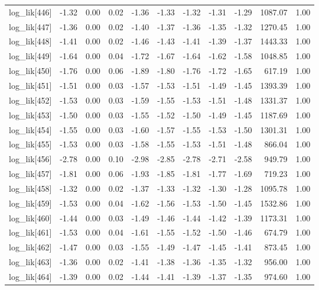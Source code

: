 \begin{table}[ht]
\begin{tabular}{rrrrrrrrrrr}
  log\_lik[446] & -1.32 & 0.00 & 0.02 & -1.36 & -1.33 & -1.32 & -1.31 & -1.29 & 1087.07 & 1.00 \\ 
  log\_lik[447] & -1.36 & 0.00 & 0.02 & -1.40 & -1.37 & -1.36 & -1.35 & -1.32 & 1270.45 & 1.00 \\ 
  log\_lik[448] & -1.41 & 0.00 & 0.02 & -1.46 & -1.43 & -1.41 & -1.39 & -1.37 & 1443.33 & 1.00 \\ 
  log\_lik[449] & -1.64 & 0.00 & 0.04 & -1.72 & -1.67 & -1.64 & -1.62 & -1.58 & 1048.85 & 1.00 \\ 
  log\_lik[450] & -1.76 & 0.00 & 0.06 & -1.89 & -1.80 & -1.76 & -1.72 & -1.65 & 617.19 & 1.00 \\ 
  log\_lik[451] & -1.51 & 0.00 & 0.03 & -1.57 & -1.53 & -1.51 & -1.49 & -1.45 & 1393.39 & 1.00 \\ 
  log\_lik[452] & -1.53 & 0.00 & 0.03 & -1.59 & -1.55 & -1.53 & -1.51 & -1.48 & 1331.37 & 1.00 \\ 
  log\_lik[453] & -1.50 & 0.00 & 0.03 & -1.55 & -1.52 & -1.50 & -1.49 & -1.45 & 1187.69 & 1.00 \\ 
  log\_lik[454] & -1.55 & 0.00 & 0.03 & -1.60 & -1.57 & -1.55 & -1.53 & -1.50 & 1301.31 & 1.00 \\ 
  log\_lik[455] & -1.53 & 0.00 & 0.03 & -1.58 & -1.55 & -1.53 & -1.51 & -1.48 & 866.04 & 1.00 \\ 
  log\_lik[456] & -2.78 & 0.00 & 0.10 & -2.98 & -2.85 & -2.78 & -2.71 & -2.58 & 949.79 & 1.00 \\ 
  log\_lik[457] & -1.81 & 0.00 & 0.06 & -1.93 & -1.85 & -1.81 & -1.77 & -1.69 & 719.23 & 1.00 \\ 
  log\_lik[458] & -1.32 & 0.00 & 0.02 & -1.37 & -1.33 & -1.32 & -1.30 & -1.28 & 1095.78 & 1.00 \\ 
  log\_lik[459] & -1.53 & 0.00 & 0.04 & -1.62 & -1.56 & -1.53 & -1.50 & -1.45 & 1532.86 & 1.00 \\ 
  log\_lik[460] & -1.44 & 0.00 & 0.03 & -1.49 & -1.46 & -1.44 & -1.42 & -1.39 & 1173.31 & 1.00 \\ 
  log\_lik[461] & -1.53 & 0.00 & 0.04 & -1.61 & -1.55 & -1.52 & -1.50 & -1.46 & 674.79 & 1.00 \\ 
  log\_lik[462] & -1.47 & 0.00 & 0.03 & -1.55 & -1.49 & -1.47 & -1.45 & -1.41 & 873.45 & 1.00 \\ 
  log\_lik[463] & -1.36 & 0.00 & 0.02 & -1.41 & -1.38 & -1.36 & -1.35 & -1.32 & 956.00 & 1.00 \\ 
  log\_lik[464] & -1.39 & 0.00 & 0.02 & -1.44 & -1.41 & -1.39 & -1.37 & -1.35 & 974.60 & 1.00 \\ 

\end{tabular}
\end{table}
